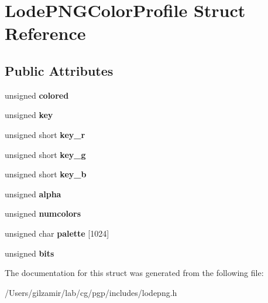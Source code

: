 \hypertarget{struct_lode_p_n_g_color_profile}{}\section{Lode\+P\+N\+G\+Color\+Profile Struct Reference}
\label{struct_lode_p_n_g_color_profile}
\subsection*{Public Attributes}
\begin{DoxyCompactItemize}
\item 
\mbox{\label{struct_lode_p_n_g_color_profile_abf063a566a4ab9f4d71b49764573d610}} 
unsigned {\bfseries colored}
\item 
\mbox{\label{struct_lode_p_n_g_color_profile_a24f19f400a53672340877eefbc837b0c}} 
unsigned {\bfseries key}
\item 
\mbox{\label{struct_lode_p_n_g_color_profile_a0398985ae0572ef97e83c33c7486cafd}} 
unsigned short {\bfseries key\+\_\+r}
\item 
\mbox{\label{struct_lode_p_n_g_color_profile_aba03e973374bd15315b8c01b86e94e8f}} 
unsigned short {\bfseries key\+\_\+g}
\item 
\mbox{\label{struct_lode_p_n_g_color_profile_a39b65ec69f6aaee3ee7312a993f21e40}} 
unsigned short {\bfseries key\+\_\+b}
\item 
\mbox{\label{struct_lode_p_n_g_color_profile_a554fea329af8034e91e1cdd8c1af0d90}} 
unsigned {\bfseries alpha}
\item 
\mbox{\label{struct_lode_p_n_g_color_profile_afdce0f5fbec46d6b8f1ec63da0a285f9}} 
unsigned {\bfseries numcolors}
\item 
\mbox{\label{struct_lode_p_n_g_color_profile_a223f8bee4c9ae8be0b70cc08f19aaead}} 
unsigned char {\bfseries palette} \mbox{[}1024\mbox{]}
\item 
\mbox{\label{struct_lode_p_n_g_color_profile_a1d3870b03dfe6d699bf4c968c9bc1890}} 
unsigned {\bfseries bits}
\end{DoxyCompactItemize}


The documentation for this struct was generated from the following file\+:\begin{DoxyCompactItemize}
\item 
/\+Users/gilzamir/lab/cg/pgp/includes/lodepng.\+h\end{DoxyCompactItemize}
